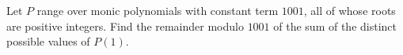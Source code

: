 Let $P$ range over monic polynomials with constant term $1001$, all of whose roots are positive integers. Find the remainder modulo $1001$ of the sum of the distinct possible values of $P(1)$.
